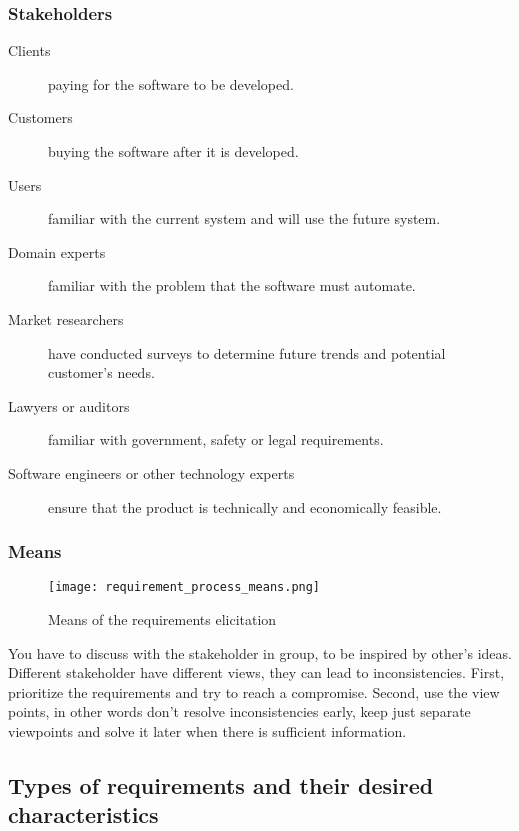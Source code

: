 \subsubsection{Stakeholders}

\begin{description}
    \item[Clients] paying for the software to be developed.
    \item[Customers] buying the software after it is developed.
    \item[Users] familiar with the current system and will use the future system.
    \item[Domain experts] familiar with the problem that the software must automate.
    \item[Market researchers] have conducted surveys to determine future trends and potential customer’s needs.
    \item[Lawyers or auditors] familiar with government, safety or legal requirements.
    \item[Software engineers or other technology experts] ensure that the product is technically and economically feasible.
\end{description}

\subsubsection{Means}

\begin{figure}[!ht]
    \centering
    \texttt{[image: requirement\_process\_means.png]}
    \caption{Means of the requirements elicitation}
\end{figure}


You have to discuss with the stakeholder in group, to be inspired by other’s ideas. Different
stakeholder have different views, they can lead to inconsistencies. First, prioritize the
requirements and try to reach a compromise. Second, use the view points, in other words
don’t resolve inconsistencies early, keep just separate viewpoints and solve it later when
there is sufficient information.

\subsection{Types of requirements and their desired characteristics}

